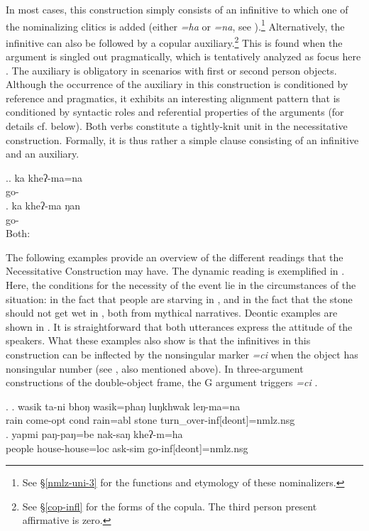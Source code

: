 In most cases, this construction simply consists of an infinitive  to which one of the nominalizing clitics is added (either \emph{=ha} or \emph{=na}, see \Next[a]).\footnote{See §\ref{nmlz-uni-3} for the functions and etymology of these nominalizers.}  Alternatively, the infinitive can also be followed by a copular auxiliary.\footnote{See §\ref{cop-infl} for the forms of the copula. The third person present affirmative is zero.} This is found when the argument is singled out pragmatically, which is tentatively analyzed as focus here \Next[b]. The auxiliary is obligatory in scenarios with first or second person objects. Although the occurrence of the auxiliary in this construction is conditioned by reference and pragmatics, it exhibits an interesting alignment pattern that is conditioned by syntactic roles and referential properties of the arguments (for details cf. below). Both verbs constitute a tightly-knit unit in the necessitative construction. Formally,  it is thus rather a simple clause consisting of an infinitive and an auxiliary. 

\ex.\ag. ka kheʔ-ma=na\\
 go- \\
\bg. ka kheʔ-ma ŋan\\
 go-  \\
Both:  


The following examples provide an overview of the different readings that the Necessitative Construction may have.
The dynamic reading is exemplified in \Next. Here, the conditions for the necessity of the event lie in the circumstances of the situation: in the fact that people are starving in \Next[a], and in the fact that the stone should not get wet in \Next[b], both from mythical narratives. Deontic examples are shown in \NNext. It is straightforward that both utterances express the attitude of the speakers. What these examples also show is that the infinitives in this construction can be inflected by the nonsingular marker \emph{=ci} when the object has nonsingular number (see \NNext, also mentioned above). In three-argument constructions of the double-object frame, the G argument triggers   \emph{=ci}  \NNext[c].


\ex. \ag. wasik  ta-ni bhoŋ wasik=phaŋ luŋkhwak leŋ-ma=na\\
rain come{\sc [3sg]-opt} {\sc cond} rain{\sc =abl} stone turn\_over-{\sc inf[deont]=nmlz.nsg}\\
\bg. yapmi  paŋ-paŋ=be nak-saŋ kheʔ-m=ha\\
		people house-house{\sc=loc} ask-{\sc sim} go-{\sc inf[deont]=nmlz.nsg}\\
	 


